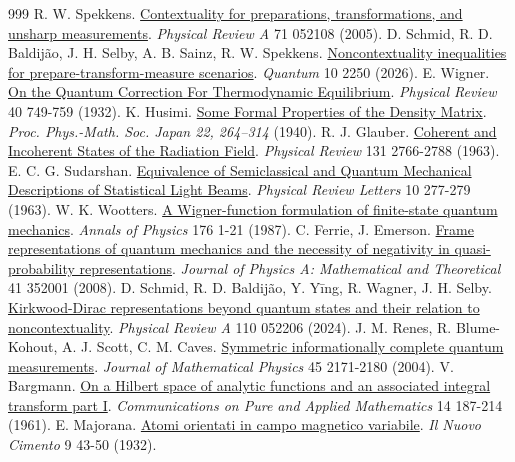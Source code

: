 \begin{thebibliography}{999}
 R. W. Spekkens. \href{https://doi.org/10.1103/PhysRevA.71.052108}{Contextuality for preparations, transformations, and unsharp measurements}. \emph{Physical Review A} 71 052108 (2005).
 D. Schmid, R. D. Baldijão, J. H. Selby, A. B. Sainz, R. W. Spekkens. \href{https://doi.org/10.22331/q-2026-10-27-2250}{Noncontextuality inequalities for prepare-transform-measure scenarios}. \emph{Quantum} 10 2250 (2026).
 E. Wigner. \href{https://doi.org/10.1103/PhysRev.40.749}{On the Quantum Correction For Thermodynamic Equilibrium}. \emph{Physical Review} 40 749-759 (1932).
 K. Husimi. \href{https://www.jstage.jst.go.jp/article/ppmsj1919/22/4/22_4_264/_article}{Some Formal Properties of the Density Matrix}. \emph{Proc. Phys.-Math. Soc. Japan 22, 264--314}  (1940).
 R. J. Glauber. \href{https://doi.org/10.1103/PhysRev.131.2766}{Coherent and Incoherent States of the Radiation Field}. \emph{Physical Review} 131 2766-2788 (1963).
 E. C. G. Sudarshan. \href{https://doi.org/10.1103/PhysRevLett.10.277}{Equivalence of Semiclassical and Quantum Mechanical Descriptions of Statistical Light Beams}. \emph{Physical Review Letters} 10 277-279 (1963).
 W. K. Wootters. \href{https://doi.org/10.1016/0003-4916(87)90176-X}{A Wigner-function formulation of finite-state quantum mechanics}. \emph{Annals of Physics} 176 1-21 (1987).
 C. Ferrie, J. Emerson. \href{https://doi.org/10.1088/1751-8113/41/35/352001}{Frame representations of quantum mechanics and the necessity of negativity in quasi-probability representations}. \emph{Journal of Physics A: Mathematical and Theoretical} 41 352001 (2008).
 D. Schmid, R. D. Baldijão, Y. Yīng, R. Wagner, J. H. Selby. \href{https://doi.org/10.1103/PhysRevA.110.052206}{Kirkwood-Dirac representations beyond quantum states and their relation to noncontextuality}. \emph{Physical Review A} 110 052206 (2024).
 J. M. Renes, R. Blume-Kohout, A. J. Scott, C. M. Caves. \href{https://doi.org/10.1063/1.1737053}{Symmetric informationally complete quantum measurements}. \emph{Journal of Mathematical Physics} 45 2171-2180 (2004).
 V. Bargmann. \href{https://doi.org/10.1002/cpa.3160140303}{On a Hilbert space of analytic functions and an associated integral transform part I}. \emph{Communications on Pure and Applied Mathematics} 14 187-214 (1961).
 E. Majorana. \href{https://doi.org/10.1007/BF02960953}{Atomi orientati in campo magnetico variabile}. \emph{Il Nuovo Cimento} 9 43-50 (1932).

\end{thebibliography}
